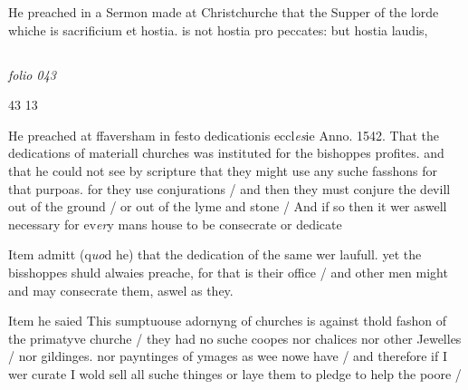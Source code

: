\documentclass[12pt, a4paper]{book}
\begin{document}
		\ifthenelse{\isodd{\thepage}}
		{\reversemarginpar}
		{\normalmarginpar}
		He preached in a Sermon made at Christchurche
 that the Supper of the lorde whiche is
 sacrificium et hostia. is not hostia pro peccates: but
 hostia laudis,



\dotfill
					  \subsection*{}

\textit{folio 043}


\begin{flushright}{\color{Mahogany}43} 13\end{flushright}
	
		
				\marginpar[\vspace{0.5cm}{\textcolor{Gray}{seditious}}]{}
			
		
		\ifthenelse{\isodd{\thepage}}
		{\reversemarginpar}
		{\normalmarginpar}
		 He preached at ffaversham in festo dedicationis eccl\textit{es}ie
			Anno. 1542. That the dedications of materiall
			churches was instituted for the bishoppes profites. and
			that he could not see by scripture that they might
			use any suche fasshons for that purpoas. for they
			use conjurations / and then they must conjure the
			devill out of the ground / or out of the lyme
			and stone / And if so then it wer aswell necessary
			for ev\textit{er}y mans house to be consecrate or dedicate
	
		
				\marginpar[\vspace{0.5cm}{\textcolor{Gray}{seditious}}]{}
			
		
		\ifthenelse{\isodd{\thepage}}
		{\reversemarginpar}
		{\normalmarginpar}
		 Item admitt (q\textit{uo}d he) that the dedication of the same
			wer laufull. yet the bisshoppes shuld alwaies
			preache, for that is their office / and other men
			might and may consecrate them, aswel as they.
	
	
		
				\marginpar[\vspace{0.5cm}{\textcolor{Gray}{seditious}}]{}
			
		
		\ifthenelse{\isodd{\thepage}}
		{\reversemarginpar}
		{\normalmarginpar}
		 Item he saied This sumptuouse adornyng of
			churches is against thold fashon of the primatyve
			churche / they had no suche coopes nor chalices
			nor other Jewelles / nor gildinges. nor payntinges
			of ymages as wee nowe have / and therefore if
			I wer curate I wold sell all suche thinges
			or laye them to pledge to help the poore /
	
\end{document}
